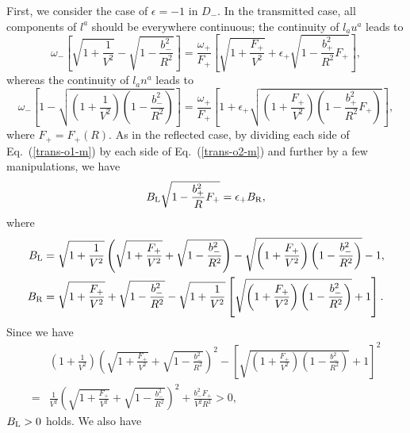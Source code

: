 \documentclass[aps,preprint,preprintnumber,nofootinbib,amsmath,amssymb,ascmac,bm,12pt]{revtex4}
\newcommand{\omp}{\omega_+}
\newcommand{\omm}{\omega_-}
\newcommand{\bpu}{b_+}
\newcommand{\bmi}{b_-}
\begin{document}
First, we consider the case of $\epsilon=-1$ in $D_-$. 
In the transmitted case, all components of $l^a$ should be everywhere continuous; 
the continuity of $l_a u^a$ leads to
\begin{equation}
\omm\left[\sqrt{1+\frac{1}{V^2}}-\sqrt{1-\dfrac{\bmi^2}{R^2}}\right]
=\frac{\omp}{F_+}\left[\sqrt{1+\dfrac{F_+}{V^2}}
+\epsilon_+\sqrt{1-\frac{\bpu^2}{R^2}F_+}\right], \label{trans-o1-m}
\end{equation}
whereas the continuity of $l_an^a$ leads to
\begin{equation}
\omm \left[1-\sqrt{\left(1+\frac{1}{V^2}\right)\left(1-\dfrac{\bmi^2}{R^2}\right)}\right]
=\frac{\omp}{F_+}\left[1+\epsilon_+\sqrt{\left(1+\dfrac{F_+}{V^2}\right)
\left(1-\frac{\bpu^2}{R^2}F_+\right)}\right], \label{trans-o2-m}
\end{equation}
where $F_+=F_+(R)$. 
As in the reflected case, by dividing each side of Eq.~(\ref{trans-o1-m}) 
by each side of Eq.~(\ref{trans-o2-m}) and further by a few manipulations, we have
\begin{equation}
B_{\rm L}\sqrt{1-\frac{\bpu^2}{R}F_+}=\epsilon_+B_{\rm R}, \label{trans-o3-m}
\end{equation}
where
\begin{align}
B_{\rm L}&=\sqrt{1+\frac{1}{V^2}}
\left(\sqrt{1+\frac{F_+}{V^2}}+\sqrt{1-\frac{\bmi^2}{R^2}}\right)
-\sqrt{\left(1+\frac{F_+}{V^2}\right)\left(1-\frac{\bmi^2}{R^2}\right)}-1, \\
B_{\rm R}&=\sqrt{1+\frac{F_+}{V^2}}+\sqrt{1-\frac{\bmi^2}{R^2}}
-\sqrt{1+\frac{1}{V^2}}
\left[\sqrt{\left(1+\frac{F_+}{V^2}\right)\left(1-\frac{\bmi^2}{R^2}\right)}+1\right]. \label{CR-m}
\end{align}
Since we have
\begin{align}
&\left(1+\frac{1}{V^2}\right)\left(\sqrt{1+\frac{F_+}{V^2}}+\sqrt{1-\frac{\bmi^2}{R^2}}\right)^2
-\left[\sqrt{\left(1+\frac{F_+}{V^2}\right)\left(1-\frac{\bmi^2}{R^2}\right)}+1\right]^2 \nonumber \\
=&\frac{1}{V^2}\left(\sqrt{1+\frac{F_+}{V^2}}+\sqrt{1-\frac{\bmi^2}{R^2}}\right)^2
+\frac{\bmi^2F_+}{V^2R^2}>0,
\end{align}
$B_{\rm L}>0$ holds. We also have
\end{document}
